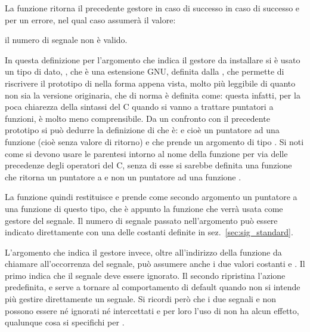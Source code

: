 \begin{funcproto}{
}

{La funzione ritorna il precedente gestore in caso di successo in caso di
  successo e  per un errore, nel qual caso 
  assumerà il valore:
  \begin{errlist}
  \item[\errcode{EINVAL}] il numero di segnale  non è valido.
  \end{errlist}
}  
\end{funcproto}

In questa definizione per l'argomento  che indica il gestore da
installare si è usato un tipo di dato, , che è una
estensione GNU, definita dalla , che permette di riscrivere il
prototipo di  nella forma appena vista, molto più leggibile di
quanto non sia la versione originaria, che di norma è definita come:
questa infatti, per la poca chiarezza della sintassi del C quando si vanno a
trattare puntatori a funzioni, è molto meno comprensibile.  Da un confronto
con il precedente prototipo si può dedurre la definizione di
 che è:
e cioè un puntatore ad una funzione  (cioè senza valore di ritorno)
e che prende un argomento di tipo . Si noti come si devono usare le
parentesi intorno al nome della funzione per via delle precedenze degli
operatori del C, senza di esse si sarebbe definita una funzione che ritorna un
puntatore a  e non un puntatore ad una funzione .

La funzione  quindi restituisce e prende come secondo argomento
un puntatore a una funzione di questo tipo, che è appunto la funzione che
verrà usata come gestore del segnale.  Il numero di segnale passato
nell'argomento  può essere indicato direttamente con una delle
costanti definite in sez.~\ref{sec:sig_standard}.  

L'argomento  che indica il gestore invece, oltre all'indirizzo
della funzione da chiamare all'occorrenza del segnale, può assumere anche i
due valori costanti  e . Il primo indica che
il segnale deve essere ignorato. Il secondo ripristina l'azione predefinita, e
serve a tornare al comportamento di default quando non si intende più gestire
direttamente un segnale. Si ricordi però che i due segnali  e
 non possono essere né ignorati né intercettati e per loro
l'uso di  non ha alcun effetto, qualunque cosa si specifichi
per .

